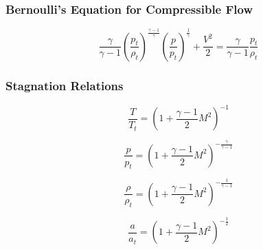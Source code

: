 \subsubsection*{Bernoulli's Equation for Compressible Flow}

\begin{equation}
	\frac{\gamma}{\gamma - 1} \left( \frac{p_t}{\rho_t} \right)^{\frac{\gamma - 1}{\gamma}} \left( \frac{p}{p_t} \right)^{\frac{1}{\gamma}} + \frac{V^2}{2} = \frac{\gamma}{\gamma - 1} \frac{p_t}{\rho_t}
\end{equation}

\subsubsection*{Stagnation Relations}

\begin{equation}
	\frac{T}{T_t} = \left( 1 + \frac{\gamma - 1}{2} M^2 \right)^{-1}
	\label{eq:total_relation_T}
\end{equation}

\begin{equation}
	\frac{p}{p_t} = \left( 1 + \frac{\gamma - 1}{2} M^2 \right)^{-\frac{\gamma}{\gamma - 1}}
	\label{eq:total_relation_p}
\end{equation}

\begin{equation}
	\frac{\rho}{\rho_t} = \left( 1 + \frac{\gamma - 1}{2} M^2 \right)^{-\frac{1}{\gamma - 1}}
	\label{eq:total_relation_rho}
\end{equation}

\begin{equation}
	\frac{a}{a_t} = \left( 1 + \frac{\gamma - 1}{2} M^2 \right)^{-\frac{1}{2}}
\end{equation}
